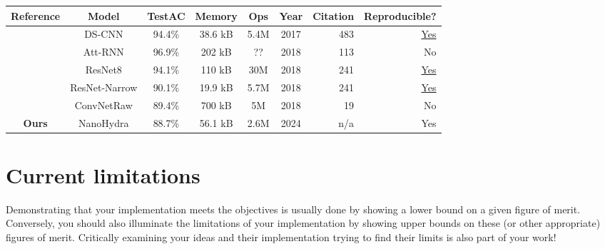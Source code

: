 
\begin{table}
\begin{tabular}{||c|c|c|c|c|c|r|r||}
    \hline
    Reference & Model & TestAC & Memory & Ops & Year & Citation & Reproducible? \\

    \hline\hline
    \cite{Zhang2017}   &        DS-CNN & 94.4\% & 38.6 kB & 5.4M & 2017 & 483 &  \href{https://github.com/ARM-software/ML-KWS-for-MCU}{Yes} \\
    \cite{Andrade2018} &       Att-RNN & 96.9\% &  202 kB &   ?? & 2018 & 113 &  No \\
    \cite{Tang2018}    &       ResNet8 & 94.1\% &  110 kB &  30M & 2018 & 241 &  \href{https://github.com/castorini/honk/}{Yes} \\
    \cite{Tang2018}    & ResNet-Narrow & 90.1\% & 19.9 kB & 5.7M & 2018 & 241 &  \href{https://github.com/castorini/honk/}{Yes} \\
    \cite{Jansson2018} &    ConvNetRaw & 89.4\% &  700 kB &   5M & 2018 &  19 &  No \\
    \textbf{Ours}      &     NanoHydra & 88.7\% & 56.1 kB & 2.6M & 2024 & n/a &  Yes \\
    \hline
\end{tabular}
\end{table}

\section{Current limitations}

Demonstrating that your implementation meets the objectives is usually done by showing a lower bound on a given figure of merit.
Conversely, you should also illuminate the limitations of your implementation by showing upper bounds on these (or other appropriate) figures of merit.
Critically examining your ideas and their implementation trying to find their limits is also part of your work!
